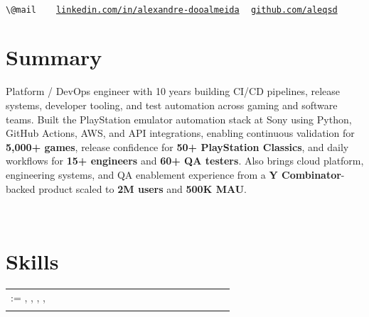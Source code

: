 \documentclass{muratcan_cv}
\makeatletter
\newcommand{\atscontactline}{%
    {\small
    \nolinkurl{\@mail} \ {\color{black}\textbar} \@address \ {\color{black}\textbar}
    \href{\@linkedinaccount}{\nolinkurl{linkedin.com/in/alexandre-dooalmeida}} \ {\color{black}\textbar}
    \href{\@githubaccount}{\nolinkurl{github.com/aleqsd}}}
}
\renewcommand\headerview{
    \hfill
    \begin{minipage}{0.94\linewidth}
        \vspace{2.6ex}
        \centering \name \\[0.14cm]
        \atscontactline \\
    \end{minipage}
    \hfill
}
\renewcommand{\explanationdetail}[1]{%
    \indent \indent \begin{minipage}{0.87\linewidth} \fontsize{8.35pt}{9.7pt}\selectfont #1 \end{minipage} \\[0.03cm]
}
\renewcommand\createskills[1]{%
    \explanationdetail{
        \scriptsize
        \setlength{\tabcolsep}{1.5pt}
        \begin{tabular}{>{\raggedright\arraybackslash}p{0.20\linewidth} >{\raggedright\arraybackslash}p{0.67\linewidth}}
            \@for\thisitem:=#1\do{\thisitem \\[0.03cm]}
        \end{tabular}
    }
}
\makeatother
\begin{document}
\headerview
\vspace{2.6ex}

\section{Summary}
\explanationdetail{
    Platform / DevOps engineer with 10 years building CI/CD pipelines, release systems, developer tooling, and test automation across gaming and software teams. Built the PlayStation emulator automation stack at Sony using Python, GitHub Actions, AWS, and API integrations, enabling continuous validation for \textbf{5,000+ games}, release confidence for \textbf{50+ PlayStation Classics}, and daily workflows for \textbf{15+ engineers} and \textbf{60+ QA testers}. Also brings cloud platform, engineering systems, and QA enablement experience from a \textbf{Y Combinator}-backed product scaled to \textbf{2M users} and \textbf{500K MAU}.
}
\vspace{1.8ex}

\section{Skills}
\createskills{
    \createskill{Languages}{Python \cpshalf Go \cpshalf TypeScript \cpshalf Rust \cpshalf Bash \cpshalf SQL \cpshalf Java \cpshalf C++ \cpshalf Lua},
    \createskill{Frameworks}{FastAPI \cpshalf Flask \cpshalf Django \cpshalf Node.js \cpshalf React \cpshalf Pytest \cpshalf Unity},
    \createskill{Cloud / Platform}{AWS \cpshalf GCP \cpshalf Azure \cpshalf GitHub Actions \cpshalf GitLab CI \cpshalf Docker \cpshalf Kubernetes},
    \createskill{AI / Tooling}{Google/Slack APIs \cpshalf Linear \cpshalf OpenAI \cpshalf Claude \cpshalf RAG (Pinecone) \cpshalf Figma},
    \createskill{Practices}{CI/CD \cpshalf Release Eng. \cpshalf Tooling \cpshalf Test Auto \cpshalf QA \cpshalf Reliability}
}
\vspace{-0.1mm}
\end{document}
